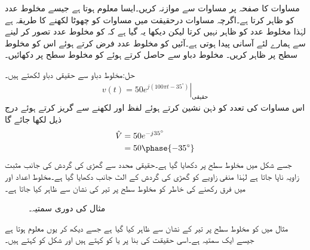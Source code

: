 مساوات  کا صفحہ  پر مساوات  سے موازنہ کریں۔ایسا معلوم ہوتا ہے جیسے   مخلوط عدد کو ظاہر کرتا ہے۔اگرچہ مساوات  درحقیقت میں مساوات  کو چھوٹا لکھنے کا طریقہ ہے لہٰذا  مخلوط عدد کو ظاہر نہیں کرتا لیکن دیکھا یہ گیا ہے کہ  کو مخلوط عدد تصور کر لینے سے ہمارے لئے آسانی پیدا ہوتی ہے۔آئیں  کو مخلوط عدد فرض کرتے ہوئے اس کو مخلوط سطح پر ظاہر کریں۔
مخلوط دباو سے  حاصل کرتے ہوئے  کو مخلوط سطح پر دکھائیں۔

حل:مخلوط دباو سے حقیقی دباو لکھتے ہیں۔
\begin{align*}
v(t)=\left. 50e^{j(100\pi t-35^{\circ})} \right|_{\text{حقیقی}}
\end{align*}
اس مساوات کی تعدد  کو ذہن نشین کرتے ہوئے لفظ  اور  لکھنے سے گریز کرتے ہوئے درج ذیل لکھا جائے گا
\begin{align*}
\hat{V}&=50e^{-j35^{\circ}}\\
&=50\phase{-35^{\circ}}
\end{align*}
جسے شکل  میں مخلوط سطح پر دکھایا گیا ہے۔حقیقی محدد سے گھڑی کی گردش کی جانب مثبت زاویہ ناپا جاتا ہے لہٰذا منفی زاویے کو گھڑی کی گردش کے الٹ جانب دکھایا گیا ہے۔مخلوط اعداد اور  میں فرق رکھنے کی خاطر  کو مخلوط سطح پر تیر کی نشان سے ظاہر کیا جاتا ہے۔
\begin{figure}
\centering
{}
\caption{مثال  کی دوری سمتیہ۔}
\label{شکل_بدلتا_دوری_سمتیہ_مثال_الف}
\end{figure}

مثال  میں  کو مخلوط سطح پر تیر کے نشان سے ظاہر کیا گیا ہے جسے دیکھ کر یوں معلوم ہوتا ہے جیسے  ایک سمتیہ ہے۔اسی حقیقت کی بنا پر  یا  کو  کہتے ہیں اور شکل  کو  کہتے ہیں۔

